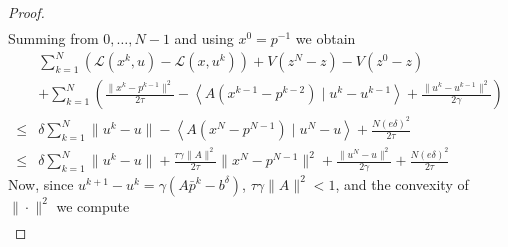 \documentclass[11pt]{report}
\newcommand{\scal}[2]{{\left\langle{{#1}\mid{#2}}\right\rangle}}
\theoremstyle{plain}{\theorembodyfont{\rmfamily}%
\newtheorem{assumption}[theorem]{Assumption}}
\theoremstyle{plain}{\theorembodyfont{\rmfamily}%
\newtheorem{algorithm}[theorem]{Algorithm}}
\theoremstyle{plain}{\theorembodyfont{\rmfamily}%
\newtheorem{example}[theorem]{Example}}
\theoremstyle{plain}{\theorembodyfont{\rmfamily}%
\newtheorem{remark}[theorem]{Remark}}
\theoremstyle{plain}{\theorembodyfont{\rmfamily}%
\newtheorem{definition}[theorem]{Definition}}
\theoremstyle{plain}{\theorembodyfont{\rmfamily}%
\newtheorem{problem}[theorem]{Problem}}
\numberwithin{equation}{chapter}
\newcommand{\dal}{u}
\newcommand{\prim}{x}
\newcommand{\proj}{p}
\begin{document}
\begin{proof}
\begin{align}
        \label{e: lagrangeII.5}
    \end{align}
    Summing from $0,\ldots,N-1$ and using $\prim^0=\proj^{-1}$ we obtain 
    \begin{align}
        &\sum_{k=1}^{N}\left(\mathcal{L}(\prim^{k},\dal)-\mathcal{L}(\prim,\dal^{k})\right)+V(z^{N}-z)-V(z^{0}-z)\nonumber\\&+\sum_{k=1}^{N}\left(\frac{\|\prim^{k}-\proj^{k-1}\|^2}{2\tau}-\scal{A(\prim^{k-1}-\proj^{k-2})}{\dal^{k}-\dal^{k-1}}+\frac{\|\dal^{k}-\dal^{k-1}\|^2}{2\gamma}\right) \nonumber\\\leq& \delta\sum_{k=1}^{N}\|\dal^{k}-\dal\| -\scal{A(\prim^{N}-\proj^{N-1})}{\dal^{N}-\dal}+\frac{N(e\delta)^2}{2\tau}\nonumber\\\leq& \delta\sum_{k=1}^{N}\|\dal^{k}-\dal\| +\frac{\tau\gamma\|A\|^2}{2\tau}\|\prim^{N}-\proj^{N-1}\|^2+\frac{\|\dal^{N}-\dal\|^2}{2\gamma}+\frac{N(e\delta)^2}{2\tau}
        \label{e: lagrangeIII}
    \end{align}
    Now, since $\dal^{k+1}-\dal^{k}=\gamma\left(A\bar{\proj}^k-b^\delta\right)$, $\tau\gamma\|A\|^2<1$, and the convexity of $\|\cdot\|^2$ we compute
    \begin{align}

\end{align}
\end{proof}
\end{document}
